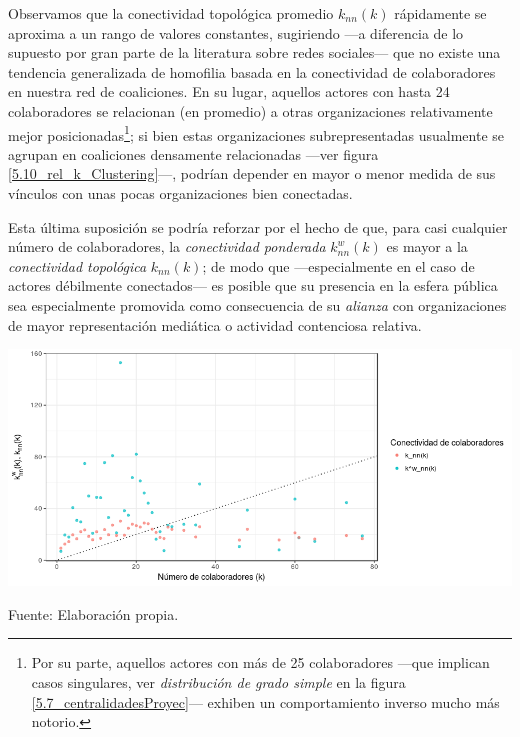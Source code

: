 \documentclass[letterpaper, 11pt]{book}
\theoremstyle{definition}
\theoremstyle{remark}
\begin{document}
Observamos que la conectividad topológica promedio $k_{nn}(k)$ rápidamente se aproxima a un rango de valores constantes, sugiriendo ---a diferencia de lo supuesto por gran parte de la literatura sobre redes sociales--- que no existe una tendencia generalizada de homofilia basada en la conectividad de colaboradores en nuestra red de coaliciones. 
En su lugar, aquellos actores con hasta 24 colaboradores se relacionan (en promedio) a otras organizaciones relativamente mejor posicionadas\footnote{
    Por su parte, aquellos actores con más de 25 colaboradores ---que implican casos singulares, ver \emph{distribución de grado simple} en la figura \ref{5.7_centralidadesProyec}--- exhiben un comportamiento inverso mucho más notorio.
}; si bien estas organizaciones subrepresentadas usualmente se agrupan en coaliciones densamente relacionadas ---ver figura \ref{5.10_rel_k_Clustering}---, podrían depender en mayor o menor medida de sus vínculos con unas pocas organizaciones bien conectadas. 


Esta última suposición se podría reforzar por el hecho de que, para casi cualquier número de colaboradores, la \emph{conectividad ponderada} $k^{w}_{nn}(k)$ es mayor a la \emph{conectividad topológica} $k_{nn}(k)$; de modo que ---especialmente en el caso de actores débilmente conectados--- es posible que su presencia en la esfera pública sea especialmente promovida como consecuencia de su \emph{alianza} con organizaciones de mayor representación mediática o actividad contenciosa relativa. 



\hspace{-0.5em}\begin{minipage}{\linewidth}
\centering
{} \label{5.13_homofiliaGrado}
\hspace{-0.5em}\includegraphics[scale=0.65]{img/5.13_homofiliaGrado.png}
\par
\small Fuente: Elaboración propia. 
\end{minipage}\bigskip
\end{document}
